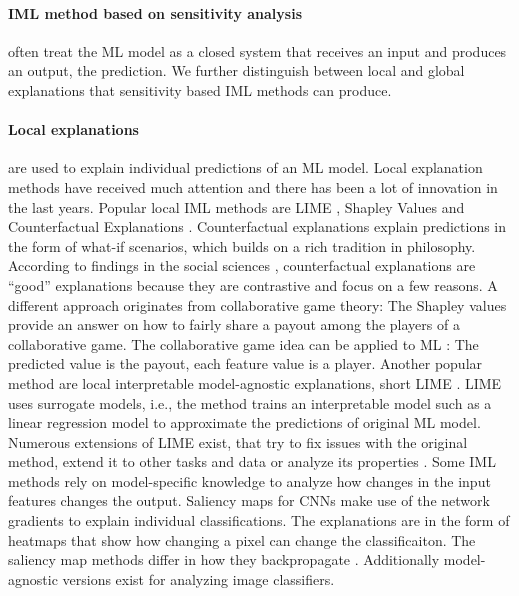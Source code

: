 \documentclass[runningheads]{llncs}
\begin{document}
\paragraph{IML method based on sensitivity analysis} often treat the ML model as a closed system that receives an input and produces an output, the prediction.
We further distinguish between local and global explanations that sensitivity based IML methods can produce.

\paragraph{Local explanations} are used to explain individual predictions of an ML model.
Local explanation methods have received much attention and there has been a lot of innovation in the last years.
Popular local IML methods are LIME \cite{ribeiro2016should}, Shapley Values \cite{lundberg2017unified,vstrumbelj2014explaining} and Counterfactual Explanations \cite{wachter2017counterfactual,dandl2020multi}.
Counterfactual explanations explain predictions in the form of what-if scenarios, which builds on a rich tradition in philosophy.
According to findings in the social sciences \cite{miller2019explanation}, counterfactual explanations are \enquote{good} explanations because they are contrastive and focus on a few reasons.
A different approach originates from collaborative game theory:
The Shapley values \cite{shapley1953value} provide an answer on how to fairly share a payout among the players of a collaborative game.
The collaborative game idea can be applied to ML \cite{vstrumbelj2014explaining,lundberg2017unified,lundberg2018consistent}: The predicted value is the payout, each feature value is a player.
Another popular method are local interpretable model-agnostic explanations, short LIME \cite{ribeiro2016should}.
LIME uses surrogate models, i.e., the method trains an interpretable model such as a linear regression model to approximate the predictions of original ML model.
Numerous extensions of LIME exist, that try to fix issues with the original method, extend it to other tasks and data or analyze its properties \cite{hu2018locally,rabold2018explaining,rabold2019enriching,visani2020optilime,haunschmid2020audiolime,rahnama2019study,shankaranarayana2019alime}.
Some IML methods rely on model-specific knowledge to analyze how changes in the input features changes the output.
Saliency maps for CNNs make use of the network gradients to explain individual classifications.
The explanations are in the form of heatmaps that show how changing a pixel can change the classificaiton.
The saliency map methods differ in how they backpropagate \cite{sundararajan2017axiomatic,lundberg2017unified,montavon2017explaining,simonyan2013deep,shrikumar2016not}.
Additionally model-agnostic versions \cite{ribeiro2016should,lundberg2017unified,zeiler2014visualizing} exist for analyzing image classifiers.
\end{document}
